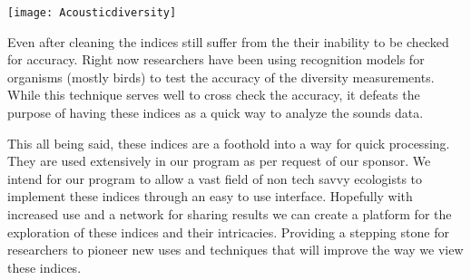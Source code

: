 \begin{center}
  \texttt{[image: Acousticdiversity]} \\[12pt]
\end{center}

Even after cleaning the indices still suffer from the their inability to be checked for accuracy. Right now researchers have been using recognition models for organisms (mostly birds) to test the accuracy of the diversity measurements. While this technique serves well to cross check the accuracy, it defeats the purpose of having these indices as a quick way to analyze the sounds data.\par
This all being said, these indices are a foothold into a way for quick processing. They are used extensively in our program as per request of our sponsor. We intend for our program to allow a vast field of non tech savvy ecologists to implement these indices through an easy to use interface. Hopefully with increased use and a network for sharing results we can create a platform for the exploration of these indices and their intricacies. Providing a stepping stone for researchers to pioneer new uses and techniques that will improve the way we view these indices.\par
